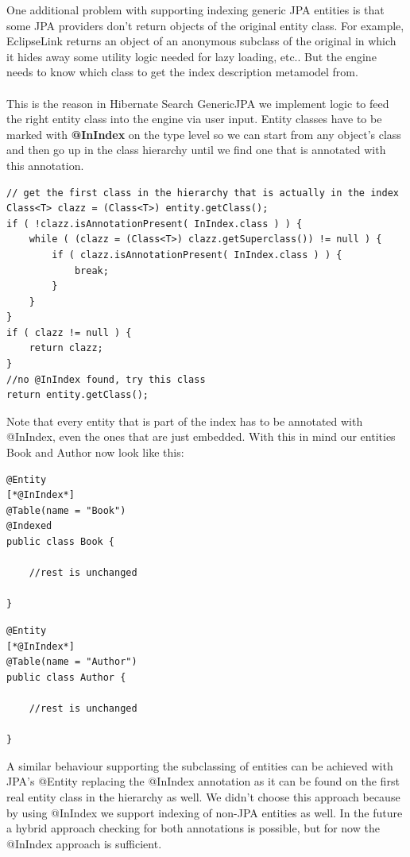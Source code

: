 \pagebreak
\noindent
One additional problem with supporting indexing generic JPA entities is that some JPA providers don't return objects of the original entity class. For example, EclipseLink returns an object of an anonymous subclass of the original in which it hides away some utility logic needed for lazy loading, etc.. But the engine needs to know which class to get the index description metamodel from.
\\\\
This is the reason in Hibernate Search GenericJPA we implement logic to feed the right entity class into the engine via user input. Entity classes have to be marked with \textbf{@InIndex} on the type level so we can start from any object's class and then go up in the class hierarchy until we find one that is annotated with this annotation.
\\
\lstset{language=java}
\begin{lstlisting}[frame=htrbl, caption={Algorithm to determine the actual indexed type}, label={lst:algo_subclasssupport}]
// get the first class in the hierarchy that is actually in the index
Class<T> clazz = (Class<T>) entity.getClass();
if ( !clazz.isAnnotationPresent( InIndex.class ) ) {
	while ( (clazz = (Class<T>) clazz.getSuperclass()) != null ) {
		if ( clazz.isAnnotationPresent( InIndex.class ) ) {
			break;
		}
	}
}
if ( clazz != null ) {
	return clazz;
}
//no @InIndex found, try this class
return entity.getClass();
\end{lstlisting}

\pagebreak
\noindent
Note that every entity that is part of the index has to be annotated with @InIndex, even the ones that are just embedded. With this in mind our entities Book and Author now look like this:
\\
\lstset{language=java}
\begin{lstlisting}[frame=htrbl, caption={Book.java with @InIndex}, label={lst:book.java_2}]
@Entity
[*@InIndex*]
@Table(name = "Book")
@Indexed
public class Book {
	
	//rest is unchanged

}
\end{lstlisting}

\lstset{language=java}
\begin{lstlisting}[frame=htrbl, caption={Author.java with @InIndex}, label={lst:author.java_2}]
@Entity
[*@InIndex*]
@Table(name = "Author")
public class Author {
	
	//rest is unchanged
	
}
\end{lstlisting}
\noindent
A similar behaviour supporting the subclassing of entities can be achieved with JPA's @Entity  replacing the @InIndex annotation as it can be found on the first real entity class in the hierarchy as well. We didn't choose this approach because by using @InIndex we support indexing of non-JPA entities as well. In the future a hybrid approach checking for both annotations is possible, but for now the @InIndex approach is sufficient.

